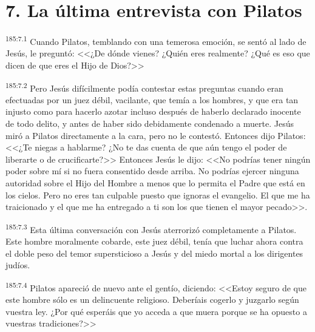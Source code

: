 \section*{7. La última entrevista con Pilatos}
\par 
\textsuperscript{185:7.1} Cuando Pilatos, temblando con una temerosa emoción, se sentó al lado de Jesús, le preguntó: <<¿De dónde vienes? ¿Quién eres realmente? ¿Qué es eso que dicen de que eres el Hijo de Dios?>>

\par 
\textsuperscript{185:7.2} Pero Jesús difícilmente podía contestar estas preguntas cuando eran efectuadas por un juez débil, vacilante, que temía a los hombres, y que era tan injusto como para hacerlo azotar incluso después de haberlo declarado inocente de todo delito, y antes de haber sido debidamente condenado a muerte. Jesús miró a Pilatos directamente a la cara, pero no le contestó. Entonces dijo Pilatos: <<¿Te niegas a hablarme? ¿No te das cuenta de que aún tengo el poder de liberarte o de crucificarte?>> Entonces Jesús le dijo: <<No podrías tener ningún poder sobre mí si no fuera consentido desde arriba. No podrías ejercer ninguna autoridad sobre el Hijo del Hombre a menos que lo permita el Padre que está en los cielos. Pero no eres tan culpable puesto que ignoras el evangelio. El que me ha traicionado y el que me ha entregado a ti son los que tienen el mayor pecado>>.

\par 
\textsuperscript{185:7.3} Esta última conversación con Jesús aterrorizó completamente a Pilatos. Este hombre moralmente cobarde, este juez débil, tenía que luchar ahora contra el doble peso del temor supersticioso a Jesús y del miedo mortal a los dirigentes judíos.

\par 
\textsuperscript{185:7.4} Pilatos apareció de nuevo ante el gentío, diciendo: <<Estoy seguro de que este hombre sólo es un delincuente religioso. Deberíais cogerlo y juzgarlo según vuestra ley. ¿Por qué esperáis que yo acceda a que muera porque se ha opuesto a vuestras tradiciones?>>

